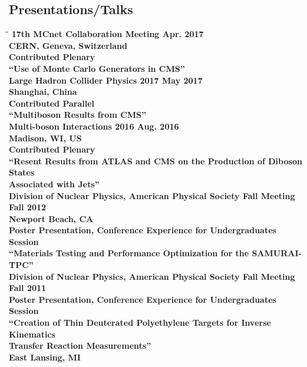 \documentclass[10pt]{res} %
\begin{document}
\begin{resume}
\section{Presentations/Talks}
\vspace{-0.1in}

\begin{tabbing}
\hspace{2.3in}\= \hspace{2.6in}\= \kill %
\bf{17th MCnet Collaboration Meeting} 		 \> \>	    Apr. 2017 \\
CERN, Geneva, Switzerland \\
Contributed Plenary\\ 
``Use of Monte Carlo Generators in CMS'' \\
\bf{Large Hadron Collider Physics 2017} 		 \> \>	    May 2017 \\
Shanghai, China \\
Contributed Parallel \\ 
``Multiboson Results from CMS'' \\

\bf{Multi-boson Interactions 2016} 		 \> \>	    Aug. 2016 \\
Madison, WI, US \\
Contributed Plenary \\ 
``Resent Results from ATLAS and CMS on the Production of Diboson States \\Associated with Jets'' \\
\bf{Division of Nuclear Physics, American Physical Society Fall Meeting} 		 \> \>	    Fall 2012 \\
Newport Beach, CA \\
Poster Presentation, Conference Experience for Undergraduates Session\\ 
``Materials Testing and Performance Optimization for the SAMURAI-TPC'' \\
\bf{Division of Nuclear Physics, American Physical Society Fall Meeting} 		 \> \>	    Fall 2011 \\
Poster Presentation, Conference Experience for Undergraduates Session\\ 
``Creation of Thin Deuterated Polyethylene Targets for Inverse Kinematics \\Transfer Reaction Measurements'' \\
East Lansing, MI \\
\end{tabbing}


\end{resume}
\end{document}
